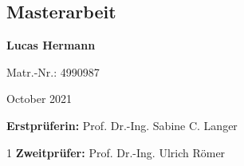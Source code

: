 \documentclass[a4paper,12pt,arial, rgb]{tubsartcl}
\begin{document}
\begin{gausspage}
\begin{segment}[c,bgcolor=tubsWhite]{2}	
\end{segment}
\begin{segment}[c,bgcolor=tubsWhite]{2}	
\end{segment}
\begin{segment}[c,bgcolor=InAGreen,fgcolor=tubsWhite]{3}					\large \noindent
\section*{\textcolor{tubsWhite}{Masterarbeit}} 	
\textbf{Lucas Hermann}

Matr.-Nr.: 4990987

{\small
October 2021
}

\textbf{Erstprüferin:} Prof. Dr.-Ing. Sabine C. Langer

\end{segment}
\begin{segment}[innerpadding=vnone,bgcolor=tubsGreen,%
	fgcolor=tubsWhite]{1} \vskip-3pt \large%
\textbf{Zweitprüfer:} Prof. Dr.-Ing. Ulrich Römer
\end{segment}
\end{gausspage}
\end{document}
